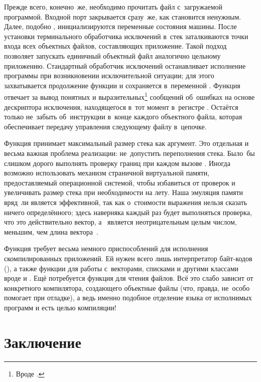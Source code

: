 Прежде всего, конечно~же, необходимо прочитать файл с~загружаемой программой.
Входной порт закрывается сразу~же, как становится ненужным. Далее, подобно
, инициализируются переменные состояния машины. После
установки терминального обработчика исключений в~стек заталкиваются точки входа
всех объектных файлов, составляющих приложение. Такой подход позволяет запускать
единичный объектный файл аналогично цельному приложению. Стандартный обработчик
исключений останавливает исполнение программы при возникновении исключительной
ситуации; для этого захватывается продолжение функции  и
сохраняется в~переменной . Функция  отвечает за
вывод понятных и выразительных\footnote{Вроде .} сообщений об~ошибках на основе дескриптора исключения, находящегося
в~тот момент в~регистре . Остаётся только не~забыть об~инструкции
 в~конце каждого объектного файла, которая обеспечивает передачу
управления следующему файлу в~цепочке.

Функция  принимает максимальный размер стека как аргумент.
Это отдельная и весьма важная проблема реализации: не~допустить переполнения
стека. Было~бы слишком дорого выполнять проверку границ при каждом вызове
. Иногда возможно использовать механизм страничной виртуальной
памяти, предоставляемый операционной системой, чтобы избавиться от проверок и
увеличивать размер стека при необходимости на лету. Наша эмуляция памяти
вряд~ли является эффективной, так как о~стоимости выражения  нельзя сказать ничего определённого; здесь наверняка каждый раз
будет выполняться проверка, что  это действительно вектор, а
~является неотрицательным целым числом, меньшим, чем длина вектора~.

Функция  требует весьма немного приспособлений для
исполнения скомпилированных приложений. Ей нужен всего лишь интерпретатор
байт-кодов (), а также функции для работы с~векторами, списками и
другими классами вроде  и . Ещё потребуется
функция  для чтения файлов. Всё это слабо зависит от конкретного
компилятора, создающего объектные файлы (что, правда, не~особо помогает при
отладке), а ведь именно подобное отделение языка от исполнимых программ и есть
целью компиляции!


\section{Заключение}\label{compilation/sect:conclusions}


